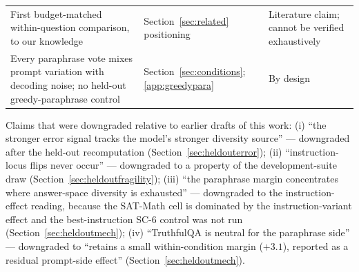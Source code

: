 \begin{table}[htbp]
\begin{tabularx}{\textwidth}{@{}p{}p{}X@{}}
First budget-matched within-question comparison, to our knowledge & Section~\ref{sec:related} positioning & Literature claim; cannot be verified exhaustively \\
Every paraphrase vote mixes prompt variation with decoding noise; no held-out greedy-paraphrase control & Section~\ref{sec:conditions}; \ref{app:greedypara} & By design \\
\bottomrule
\end{tabularx}
\end{table}

Claims that were downgraded relative to earlier drafts of this work: (i) ``the stronger error signal tracks the model's stronger diversity source'' --- downgraded after the held-out recomputation (Section~\ref{sec:heldouterror}); (ii) ``instruction-locus flips never occur'' --- downgraded to a property of the development-suite draw (Section~\ref{sec:heldoutfragility}); (iii) ``the paraphrase margin concentrates where answer-space diversity is exhausted'' --- downgraded to the instruction-effect reading, because the SAT-Math cell is dominated by the instruction-variant effect and the best-instruction SC-6 control was not run (Section~\ref{sec:heldoutmech}); (iv) ``TruthfulQA is neutral for the paraphrase side'' --- downgraded to ``retains a small within-condition margin ($+3.1$), reported as a residual prompt-side effect'' (Section~\ref{sec:heldoutmech}).
